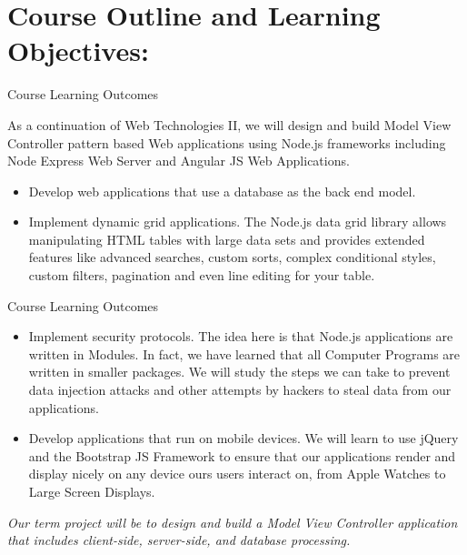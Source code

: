 \section{Course Outline and Learning Objectives:}

	\begin{frame}{Course Learning Outcomes}
	  
	As a continuation of Web Technologies II, we will design and build Model View Controller pattern based Web applications using Node.js frameworks including Node Express Web Server and Angular JS Web Applications.  
	\begin{itemize}

	    \item Develop web applications that use a database as the back end model.
	    
	    \item Implement dynamic grid applications. The Node.js data grid library allows manipulating HTML tables with large data sets and provides extended features like advanced searches, custom sorts, complex conditional styles, custom filters, pagination and even line editing for your table. 
	\end{itemize}	    
	    
	\end{frame}	    
	
	\begin{frame}{Course Learning Outcomes}	
	\begin{itemize}	
	    \item Implement security protocols. The idea here is that Node.js applications are written in Modules. In fact, we have learned that all Computer Programs are written in smaller packages. We will study the steps we can take to prevent data injection attacks and other attempts by hackers to steal data from our applications. 
	    \item Develop applications that run on mobile devices. We will learn to use jQuery and the Bootstrap JS Framework to ensure that our applications render and display nicely on any device ours users interact on, from Apple Watches to Large Screen Displays.
	    
	\end{itemize}

		\emph{Our term project will be to design and build a Model View Controller application that includes client-side, server-side, and database processing.}	
		\end{frame}	  